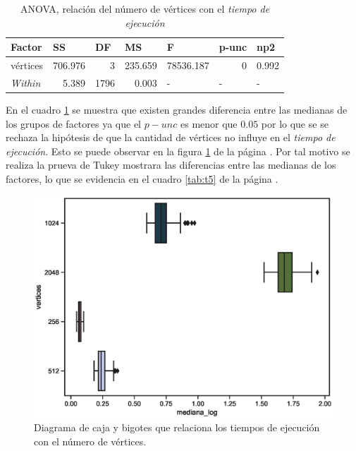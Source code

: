 \documentclass{article}
\begin{document}
\begin{table}[htbp]
  \centering
  \caption{ANOVA, relación del número de vértices con el \textit{tiempo de ejecución}}
    \begin{tabular}{lrrrlll}
    \toprule
    \textbf{Factor} & \multicolumn{1}{l}{\textbf{SS}} & \multicolumn{1}{l}{\textbf{DF}} & \multicolumn{1}{l}{\textbf{MS}} & \textbf{F} & \textbf{p-unc} & \textbf{np2} \\
    \midrule
    vértices & 706.976 & 3     & 235.659 & \multicolumn{1}{r}{78536.187} & \multicolumn{1}{r}{0} & \multicolumn{1}{r}{0.992} \\
    \textit{Within} & 5.389 & 1796  & 0.003 & -     & -     & - \\
    \bottomrule
    \end{tabular}%
  \label{tab:t4}%
\end{table}%
En el cuadro \ref{tab:t4} se muestra que existen grandes diferencia entre las medianas de los grupos de factores ya que el $p-unc$ es menor que $0.05$ por lo que se se rechaza la hipótesis de que la cantidad de vértices no influye en el \textit{tiempo de ejecución}. Esto se puede observar en la figura \ref{fig6} de la página \pageref{fig6}. Por tal motivo se realiza la prueva de Tukey mostrara las diferencias entre las medianas de los factores, lo que se evidencia en el cuadro \ref{tab:t5} de la página \pageref{tab:t5}.   
\begin{center}
\begin{figure}[htbp]
\includegraphics[scale=0.6]{boxplotvertices.eps}
\caption{Diagrama de caja y bigotes que relaciona los tiempos de ejecución con el número de vértices.}
\label{fig6}
\end{figure}
\end{center}
\end{document}
